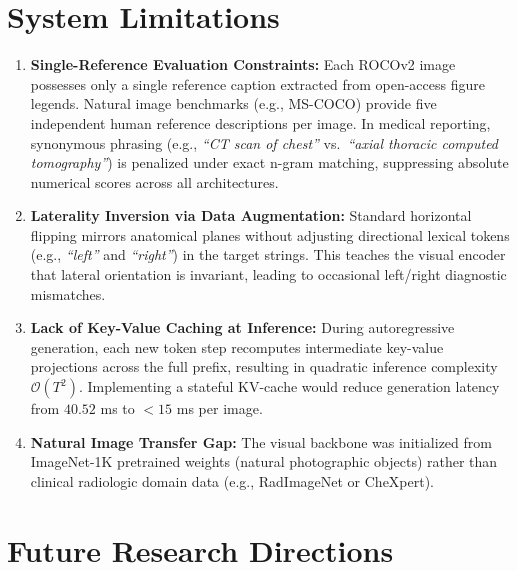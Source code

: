 \section{System Limitations}

\begin{enumerate}
\item \textbf{Single-Reference Evaluation Constraints:} Each ROCOv2 image possesses only a single reference caption extracted from open-access figure legends. Natural image benchmarks (e.g., MS-COCO) provide five independent human reference descriptions per image. In medical reporting, synonymous phrasing (e.g., \emph{``CT scan of chest''} vs.\ \emph{``axial thoracic computed tomography''}) is penalized under exact n-gram matching, suppressing absolute numerical scores across all architectures.
\item \textbf{Laterality Inversion via Data Augmentation:} Standard horizontal flipping mirrors anatomical planes without adjusting directional lexical tokens (e.g., \emph{``left''} and \emph{``right''}) in the target strings. This teaches the visual encoder that lateral orientation is invariant, leading to occasional left/right diagnostic mismatches.
\item \textbf{Lack of Key-Value Caching at Inference:} During autoregressive generation, each new token step recomputes intermediate key-value projections across the full prefix, resulting in quadratic inference complexity $\mathcal{O}(T^2)$. Implementing a stateful KV-cache would reduce generation latency from $40.52$ ms to $< 15$ ms per image.
\item \textbf{Natural Image Transfer Gap:} The visual backbone was initialized from ImageNet-1K pretrained weights (natural photographic objects) rather than clinical radiologic domain data (e.g., RadImageNet or CheXpert).
\end{enumerate}

\section{Future Research Directions}

